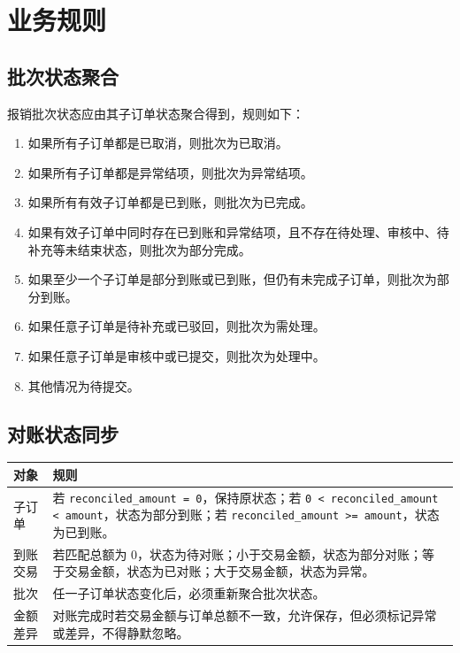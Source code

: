 \documentclass[UTF8,zihao=-4]{ctexart}
\begin{document}
\section{业务规则}

\subsection{批次状态聚合}

报销批次状态应由其子订单状态聚合得到，规则如下：

\begin{enumerate}
  \item 如果所有子订单都是已取消，则批次为已取消。
  \item 如果所有子订单都是异常结项，则批次为异常结项。
  \item 如果所有有效子订单都是已到账，则批次为已完成。
  \item 如果有效子订单中同时存在已到账和异常结项，且不存在待处理、审核中、待补充等未结束状态，则批次为部分完成。
  \item 如果至少一个子订单是部分到账或已到账，但仍有未完成子订单，则批次为部分到账。
  \item 如果任意子订单是待补充或已驳回，则批次为需处理。
  \item 如果任意子订单是审核中或已提交，则批次为处理中。
  \item 其他情况为待提交。
\end{enumerate}

\subsection{对账状态同步}

\begin{longtable}{p{4.2cm}p{10.2cm}}
\toprule
对象 & 规则 \\
\midrule
子订单 & 若 \texttt{reconciled\_amount = 0}，保持原状态；若 \texttt{0 < reconciled\_amount < amount}，状态为部分到账；若 \texttt{reconciled\_amount >= amount}，状态为已到账。 \\
到账交易 & 若匹配总额为 0，状态为待对账；小于交易金额，状态为部分对账；等于交易金额，状态为已对账；大于交易金额，状态为异常。 \\
批次 & 任一子订单状态变化后，必须重新聚合批次状态。 \\
金额差异 & 对账完成时若交易金额与订单总额不一致，允许保存，但必须标记异常或差异，不得静默忽略。 \\
\bottomrule
\end{longtable}
\end{document}
